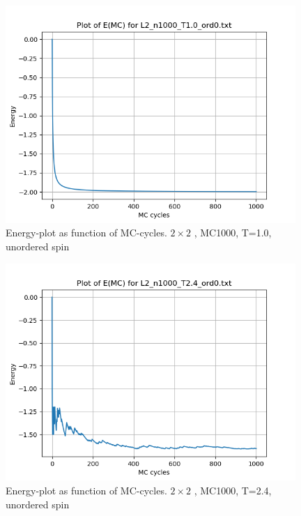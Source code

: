 \documentclass{article}
\begin{document}
\begin{figure}[ht]
    \centering
    \includegraphics[width = 11cm]{img/energy_L2_n1000_T10_ord0.png}
    \caption{Energy-plot as function of MC-cycles. \texorpdfstring{ $2 \times 2$ }{text}, MC1000, T=1.0, unordered spin}
    \label{fig:energy_L2_n1000_T1.0_ord0}
  \end{figure}

\begin{figure}[ht]
    \centering
    \includegraphics[width = 11cm]{img/energy_L2_n1000_T24_ord0.png}
    \caption{Energy-plot as function of MC-cycles. \texorpdfstring{ $2 \times 2$ }{text}, MC1000, T=2.4, unordered spin}
    \label{fig:energy_L2_n1000_T2.4_ord0}
  \end{figure}
\end{document}
